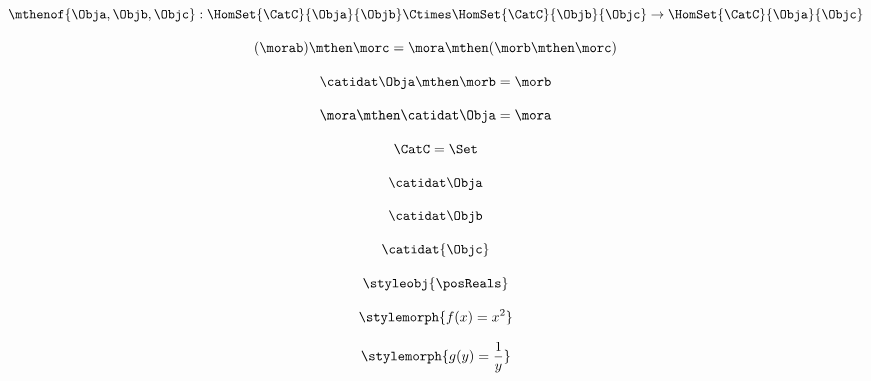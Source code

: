 {\begin{forslides}
        \begin{equation}
            \label{eq:semicats-slides-19}
            \mthenof{\Obja,\Objb,\Objc}: \HomSet{\CatC}{\Obja}{\Objb} \Ctimes \HomSet{\CatC}{\Objb}{\Objc}\to \HomSet{\CatC}{\Obja}{\Objc}
        \end{equation}

        \begin{equation}
            \label{eq:semicats-slides-20}
            (\morab)
            \mthen \morc= \mora \mthen (\morb \mthen \morc)
        \end{equation}

        \begin{equation}
            \label{eq:semicats-slides-21}
            \catidat\Obja \mthen \morb = \morb
        \end{equation}

        \begin{equation}
            \label{eq:semicats-slides-22}
            \mora \mthen \catidat\Obja = \mora
        \end{equation}

        \begin{equation}
            \label{eq:semicats-slides-23}
            \CatC = \Set
        \end{equation}

        \begin{equation}
            \label{eq:semicats-slides-24}
            \catidat\Obja
        \end{equation}

        \begin{equation}
            \label{eq:semicats-slides-25}
            \catidat\Objb
        \end{equation}

        \begin{equation}
            \label{eq:semicats-slides-26}
            \catidat{\Objc}
        \end{equation}

        \begin{equation}
            \label{eq:semicats-slides-27}
            \styleobj{\posReals}
        \end{equation}

        \begin{equation}
            \label{eq:semicats-slides-28}
            \stylemorph{f(x) = x^2}
        \end{equation}

        \begin{equation}
            \label{eq:semicats-slides-29}
            \stylemorph{g(y) = \frac{1}{y}}
        \end{equation}


\end{forslides}}
